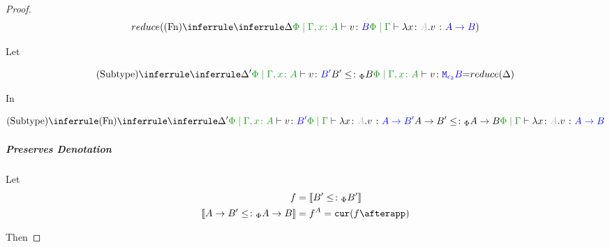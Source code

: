\documentclass{report}
\begin{document}
\begin{framed}
\begin{proof}
                        \begin{equation}
                            \reduce(\ntreeruleI{Fn}{
                                \treeruleI{\D}{\etyperelation{\P}{\gax}{v}{B}}
                            }{\gpetyperelation{\lam{x}{A}{v}}{\ab}})
                        \end{equation}
        
                        Let 
        
                        \begin{equation}
                            \ntreeruleII{Subtype}{
                                \treeruleI{\D'}{\etyperelation{\P}{\gax}{v}{B'}}
                                B' \subtypep B
                            }{
                                \etyperelation{\P}{\gax}{v}{\M{\e_2}{B}}
                            } = \reduce(\D)
                        \end{equation}
        
                        In
        
                        \begin{equation}
                            \ntreeruleII{Subtype}{
                                \ntreeruleI{Fn}{
                                    \treeruleI{
                                        \D'
                                    }{
                                        \etyperelation{\P}{\gax}{v}{B'}
                                    }    
                                }{
                                    \gpetyperelation{\lam{x}{A}{v}}{\fntype{A}{B'}}
                                }
                                }{
                                \fntype{A}{B'}\subtypep\fntype{A}{B}
                            } {
                                \gpetyperelation{\lam{x}{A}{v}}{\fntype{A}{B}}
                            }
                        \end{equation}
        
                    \subparagraph{Preserves Denotation}
                        Let
                        \begin{align*}
                            f &= \deno{B'\subtypep B'} \\
                            \deno{\fntype{A}{B'}\subtypep\fntype{A}{B}} & = f^A = \cur{f\after \app}
                        \end{align*}
        
                        Then
        

\end{proof}
\end{framed}
\end{document}
